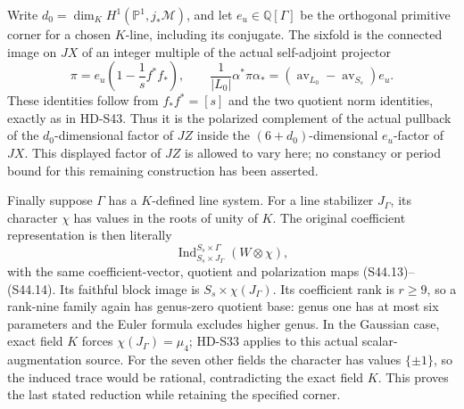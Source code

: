 Write \(d_0=\dim_KH^1(\mathbb P^1,j_*\mathcal M)\), and
let \(e_u\in\mathbb Q[\Gamma]\) be the orthogonal primitive
corner for a chosen \(K\)-line, including its conjugate.
The sixfold is the connected image on \(JX\) of an integer
multiple of the actual self-adjoint projector
\[
 \pi=e_u\left(1-\frac1s f^*f_*\right),\qquad
 \frac1{|L_0|}\alpha^*\pi\alpha_*
            =(\operatorname{av}_{L_0}-\operatorname{av}_{S_s})e_u.
                                                               \tag{S45.12}
\]
These identities follow from \(f_*f^*=[s]\) and the two
quotient norm identities, exactly as in HD-S43.
Thus it is the polarized complement of the actual pullback
of the \(d_0\)-dimensional factor of \(JZ\) inside the
\((6+d_0)\)-dimensional \(e_u\)-factor of \(JX\).
This displayed factor of \(JZ\) is allowed to vary here;
no constancy or period bound for this remaining construction
has been asserted.

Finally suppose \(\Gamma\) has a \(K\)-defined line system.
For a line stabilizer \(J_\Gamma\), its character \(\chi\)
has values in the roots of unity of \(K\). The original
coefficient representation is then literally
\[
 \operatorname{Ind}_{S_s\times J_\Gamma}^{S_s\times\Gamma}
                      (W\otimes\chi),                     \tag{S45.13}
\]
with the same coefficient-vector, quotient and polarization
maps (S44.13)--(S44.14). Its faithful block image is
\(S_s\times\chi(J_\Gamma)\). Its coefficient rank is
\(r\ge9\), so a rank-nine family again has genus-zero
quotient base: genus one has at most six parameters and
the Euler formula excludes higher genus. In the Gaussian case,
exact field \(K\) forces \(\chi(J_\Gamma)=\mu_4\);
HD-S33 applies to this actual scalar-augmentation source.
For the seven other fields the character has values
\(\{\pm1\}\), so the induced trace would be rational,
contradicting the exact field \(K\). This proves the
last stated reduction while retaining the specified corner.
